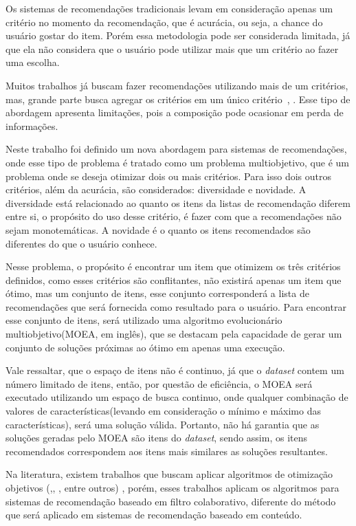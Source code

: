 Os sistemas de recomendações tradicionais levam em consideração apenas um critério no momento da recomendação, que é acurácia, ou seja, a chance do usuário gostar do item. Porém essa metodologia pode ser considerada limitada, já que ela não considera que o usuário pode utilizar mais que um critério ao fazer uma escolha\cite{adomavicius2011multi}. 

Muitos trabalhos já buscam fazer recomendações utilizando mais de um critérios, mas, grande parte busca agregar os critérios em um único critério~\cite{yager1988ordered}, \cite{kaymak1994selecting}. Esse tipo de abordagem apresenta limitações, pois a composição pode ocasionar em perda de informações.

Neste trabalho  foi definido um nova abordagem para sistemas de recomendações, onde esse tipo de problema é tratado como um problema multiobjetivo, que é um problema onde se deseja otimizar dois ou mais critérios. Para isso dois outros critérios, além da acurácia, são considerados: diversidade e novidade. A diversidade está relacionado ao quanto os itens da listas de recomendação diferem entre si, o propósito do uso desse critério, é fazer com que a recomendações não sejam monotemáticas\cite{hurley2011novelty}. A novidade é o quanto os itens recomendados são diferentes do que o usuário conhece\cite{hurley2011novelty}. 


Nesse problema, o propósito é encontrar um item que otimizem os três critérios definidos, como esses critérios são conflitantes, não existirá apenas um item que ótimo, mas um conjunto de itens, esse conjunto corresponderá a lista de recomendações que será fornecida como resultado para o usuário. Para encontrar esse conjunto de itens, será utilizado uma algoritmo evolucionário multiobjetivo(MOEA, em inglês), que se destacam pela capacidade de gerar um conjunto de soluções próximas ao ótimo  em apenas uma execução.

Vale ressaltar, que o espaço de itens não é continuo, já que o \textit{dataset} contem um número limitado de itens, então, por questão de eficiência, o MOEA será executado utilizando um espaço de busca continuo, onde qualquer combinação de valores de características(levando em consideração o mínimo e máximo das características), será uma solução válida. Portanto, não  há garantia que as soluções geradas pelo MOEA são itens do \textit{dataset}, sendo assim, os itens recomendados correspondem aos itens mais similares as soluções resultantes.

Na literatura, existem trabalhos que buscam aplicar algoritmos de otimização objetivos (\cite{oliveira2018multi},\cite{ribeiro2015multiobjective}, \cite{zuo2015personalized}, entre outros) , porém, esses trabalhos aplicam os algoritmos para sistemas de recomendação baseado em filtro colaborativo, diferente do método que será aplicado em sistemas de recomendação baseado em conteúdo.

